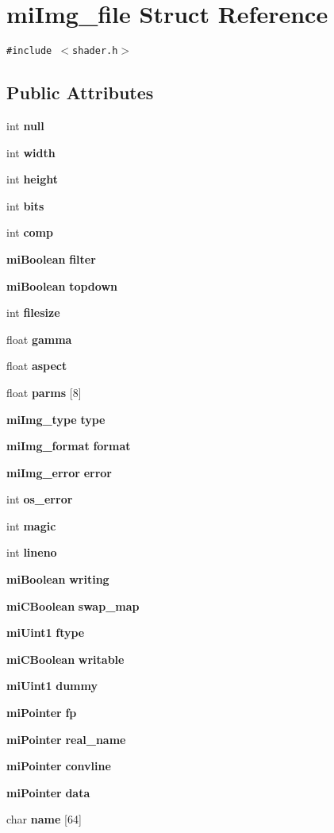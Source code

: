 \section{mi\-Img\_\-file Struct Reference}
\label{structmiImg__file}
{\tt \#include $<$shader.h$>$}

\subsection*{Public Attributes}
\begin{CompactItemize}
\item 
int {\bf null}
\item 
int {\bf width}
\item 
int {\bf height}
\item 
int {\bf bits}
\item 
int {\bf comp}
\item 
{\bf mi\-Boolean} {\bf filter}
\item 
{\bf mi\-Boolean} {\bf topdown}
\item 
int {\bf filesize}
\item 
float {\bf gamma}
\item 
float {\bf aspect}
\item 
float {\bf parms} [8]
\item 
{\bf mi\-Img\_\-type} {\bf type}
\item 
{\bf mi\-Img\_\-format} {\bf format}
\item 
{\bf mi\-Img\_\-error} {\bf error}
\item 
int {\bf os\_\-error}
\item 
int {\bf magic}
\item 
int {\bf lineno}
\item 
{\bf mi\-Boolean} {\bf writing}
\item 
{\bf mi\-CBoolean} {\bf swap\_\-map}
\item 
{\bf mi\-Uint1} {\bf ftype}
\item 
{\bf mi\-CBoolean} {\bf writable}
\item 
{\bf mi\-Uint1} {\bf dummy}
\item 
{\bf mi\-Pointer} {\bf fp}
\item 
{\bf mi\-Pointer} {\bf real\_\-name}
\item 
{\bf mi\-Pointer} {\bf convline}
\item 
{\bf mi\-Pointer} {\bf data}
\item 
char {\bf name} [64]
\end{CompactItemize}


